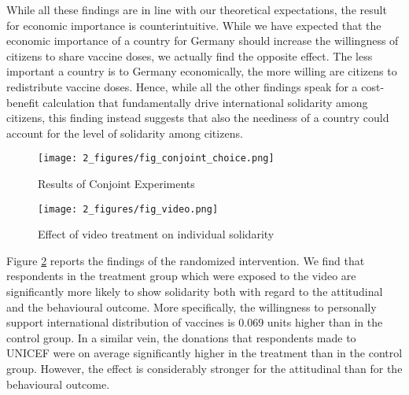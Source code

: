 \documentclass[12pt,oneside,smallheadings,chapterprefix=true]{article}
\begin{document}
While all these findings are in line with our theoretical expectations, the result for economic importance is counterintuitive. While we have expected that the economic importance of a country for Germany should increase the willingness of citizens to share vaccine doses, we actually find the opposite effect. The less important a country is to Germany economically, the more willing are citizens to redistribute vaccine doses. Hence, while all the other findings speak for a cost-benefit calculation that fundamentally drive international solidarity among citizens, this finding instead suggests that also the neediness of a country could account for the level of solidarity among citizens. 




\begin{figure}[hbt!]
\texttt{[image: 2\_figures/fig\_conjoint\_choice.png]}
\caption{Results of Conjoint Experiments}
\label{fig:conjoint_choice}
\end{figure}



\begin{figure}[hbt!]
\texttt{[image: 2\_figures/fig\_video.png]}
\caption{Effect of video treatment on individual solidarity}
\label{fig:video}
\end{figure}


Figure \ref{fig:video} reports the findings of the randomized intervention. We find that respondents in the treatment group which were exposed to the video are significantly more likely to show solidarity both with regard to the attitudinal and the behavioural outcome. More specifically, the willingness to personally support international distribution of vaccines is 0.069 units higher than in the control group. In a similar vein, the donations that respondents made to UNICEF were on average significantly higher in the treatment than in the control group. However, the effect is considerably stronger for the attitudinal than for the behavioural outcome. 
\end{document}
